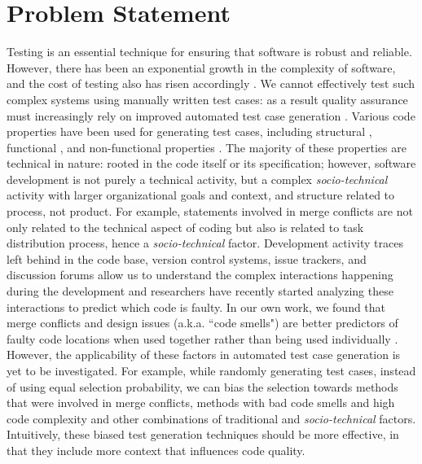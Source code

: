 \documentclass[10pt]{article}
\begin{document}
\section{Problem Statement}
Testing is an essential technique for ensuring that software is robust and reliable. However, there has been an exponential growth in the complexity of software, and the cost of testing also has risen accordingly \cite{myers2011art}. We cannot effectively test such complex systems using manually written test cases: as a result quality assurance must increasingly rely on improved automated test case generation \cite{anand2013orchestrated,harman2012search}. Various code properties have been used for generating test cases, including structural \cite{tonella2004evolutionary}, functional \cite{wegener2004evaluation}, and non-functional properties \cite{wegener1998verifying}. The majority of these properties are technical in nature:  rooted in the code itself or its specification; however, software development is not purely a technical activity, but a complex \emph{socio-technical} activity with larger organizational goals and context, and structure related to process, not product. For example, statements involved in merge conflicts are not only related to the technical aspect of coding but also is related to task distribution process, hence a \emph{socio-technical} factor. Development activity traces left behind in the code base, version control systems, issue trackers, and discussion forums allow us to understand the complex interactions happening during the   development and researchers have recently started analyzing these interactions to predict which code is faulty. In our own work, we found that merge conflicts and design issues (a.k.a. ``code smells") are better predictors of faulty code locations when used together rather than being used individually \cite{ahmedempirical} . However, the applicability of these factors in automated test case generation is yet to be investigated. For example, while randomly generating test cases, instead of using equal selection probability, we can bias the selection towards methods that were involved in merge conflicts, methods with bad code smells and high code complexity and other combinations of traditional and \emph{socio-technical} factors. Intuitively, these biased test generation techniques should be more effective, in that they include more context that influences code quality.
\end{document}
